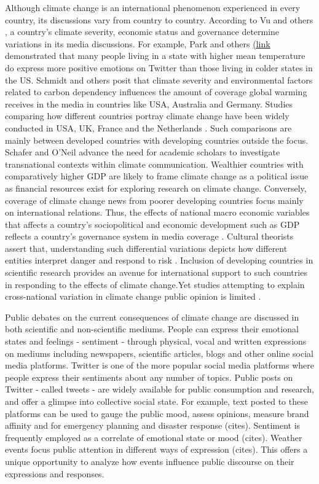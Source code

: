 \documentclass{article}
\begin{document}
Although climate change is an international phenomenon experienced in every country, its discussions vary from country to country. According to Vu and others \cite{vu_nationalizing_2019}, a country’s climate severity, economic status and governance determine variations in its media discussions. For example, Park and others \cite{park_mood_2013} \href{https://pdfs.semanticscholar.org/b282/feb759e57530b115dcc4bb080f96598a5246.pdf}{(link} demonstrated that many people living in a state with higher mean temperature do express more positive emotions on Twitter than those living in colder states in the US. Schmidt and others \cite{schmidt_media_2013} posit that climate severity and environmental factors related to carbon dependency influences the amount of coverage global warming receives in the media in countries like USA, Australia and Germany. Studies comparing how different countries portray climate change have been widely conducted in USA, UK, France and the Netherlands \cite{vu_nationalizing_2019}. Such comparisons are mainly between developed countries with developing countries outside the focus.  Schafer and O’Neil \cite{schafer_what_2013} advance the need for academic scholars to investigate transnational contexts within climate communication. Wealthier countries with comparatively higher GDP are likely to frame climate change as a political issue as financial resources exist for exploring research on climate change. Conversely, coverage of climate change news from poorer developing countries focus mainly on international relations. Thus, the effects of national macro economic variables that affects a country’s sociopolitical and economic development such as GDP reflects a country’s governance system in media coverage \cite{vu_what_2018}. Cultural theorists assert that, understanding such differential variations depicts how different entities interpret danger and respond to risk \cite{tansey_cultural_1999}. Inclusion of developing countries in scientific research provides an avenue for international support to such countries in responding to the effects of climate change.Yet studies attempting to explain cross-national variation in climate change public opinion is limited \cite{knight_public_2016}.

Public debates on the current consequences of climate change are discussed in both scientific and non-scientific mediums. People can express their emotional states and feelings - sentiment - through physical, vocal and written expressions on mediums including newspapers, scientific articles, blogs and other online social media platforms. Twitter is one of the more popular social media platforms where people express their sentiments about any number of topics. Public posts on Twitter - called tweets - are widely available for public consumption and research, and offer a glimpse into collective social state. For example, text posted to these platforms can be used to gauge the public mood, assess opinions, measure brand affinity and for emergency planning and disaster response (cites). Sentiment is frequently employed as a correlate of emotional state or mood (cites). Weather events focus public attention in different ways of expression (cites). This offers a unique opportunity to analyze how events influence public discourse on their expressions and responses.
\end{document}
